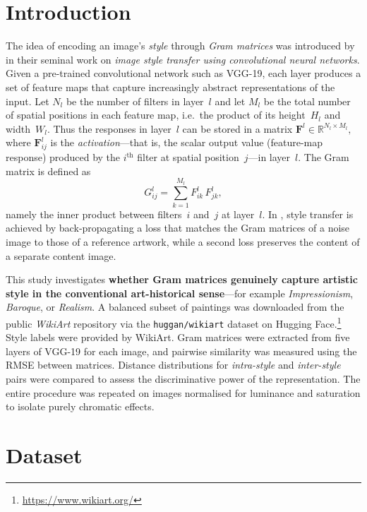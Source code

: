 \documentclass[a4paper,11pt]{article}
\begin{document}
\section{Introduction}
The idea of encoding an image’s \emph{style} through \emph{Gram matrices} was introduced by \textcite{gatys2016} in their seminal work on \emph{image style transfer using convolutional neural networks}.
Given a pre-trained convolutional network such as VGG-19, each layer produces a set of feature maps that capture increasingly abstract representations of the input.  
Let $N_{l}$ be the number of filters in layer~$l$ and let $M_{l}$ be the total number of spatial positions in each feature map, i.e.\ the product of its height~$H_{l}$ and width~$W_{l}$.  
Thus the responses in layer~$l$ can be stored in a matrix $\boldsymbol{F}^{l}\in\mathbb{R}^{N_{l}\times M_{l}},$
where $\boldsymbol{F}^{l}_{ij}$ is the \emph{activation}—that is, the scalar output value (feature-map response) produced by the $i^{\text{th}}$ filter at spatial position~$j$—in layer~$l$.  
The Gram matrix is defined as
\begin{equation}
    G_{ij}^l = \sum_{k=1}^{M_l} F_{ik}^l \, F_{jk}^l,
    \label{eq:gram}
\end{equation}
namely the inner product between filters~$i$ and~$j$ at layer~$l$. In \textcite{gatys2016}, style transfer is achieved by back‑propagating a loss that matches the Gram matrices of a noise image to those of a reference artwork, while a second loss preserves the content of a separate content image.

\medskip
This study investigates \textbf{whether Gram matrices genuinely capture artistic style in the conventional art-historical sense}—for example \emph{Impressionism}, \emph{Baroque}, or \emph{Realism}.
A balanced subset of paintings was downloaded from the public \emph{WikiArt} repository via the \texttt{huggan/wikiart} dataset on Hugging Face.\footnote{\url{https://www.wikiart.org/}}
Style labels were provided by WikiArt.
Gram matrices were extracted from five layers of VGG-19 for each image, and pairwise similarity was measured using the RMSE between matrices.
Distance distributions for \emph{intra-style} and \emph{inter-style} pairs were compared to assess the discriminative power of the representation.
The entire procedure was repeated on images normalised for luminance and saturation to isolate purely chromatic effects.

\section{Dataset}
\end{document}
